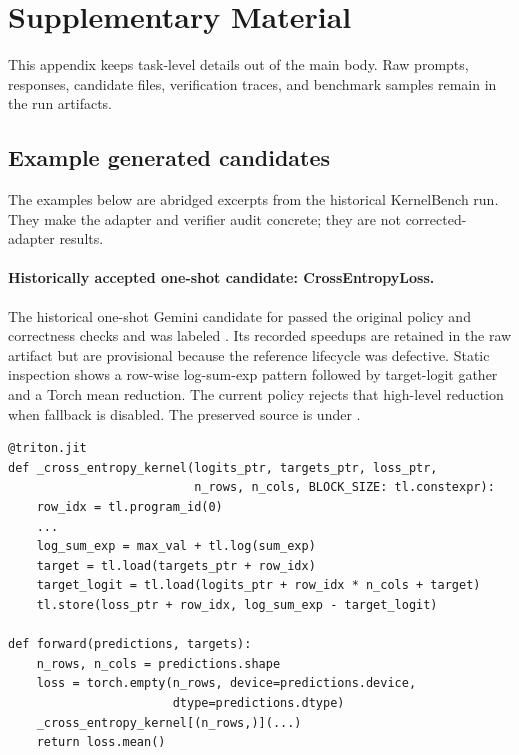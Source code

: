 \section{Supplementary Material}

This appendix keeps task-level details out of the main body. Raw prompts, responses, candidate files, verification traces, and benchmark samples remain in the run artifacts.

\subsection{Example generated candidates}

The examples below are abridged excerpts from the historical KernelBench run. They make the adapter and verifier audit concrete; they are not corrected-adapter results.

\paragraph{Historically accepted one-shot candidate: CrossEntropyLoss.}
The historical one-shot Gemini candidate for  passed the original policy and correctness checks and was labeled . Its recorded speedups are retained in the raw artifact but are provisional because the reference lifecycle was defective. Static inspection shows a row-wise log-sum-exp pattern followed by target-logit gather and a Torch mean reduction. The current  policy rejects that high-level reduction when fallback is disabled. The preserved source is under .

{\scriptsize
\begin{verbatim}
@triton.jit
def _cross_entropy_kernel(logits_ptr, targets_ptr, loss_ptr,
                          n_rows, n_cols, BLOCK_SIZE: tl.constexpr):
    row_idx = tl.program_id(0)
    ...
    log_sum_exp = max_val + tl.log(sum_exp)
    target = tl.load(targets_ptr + row_idx)
    target_logit = tl.load(logits_ptr + row_idx * n_cols + target)
    tl.store(loss_ptr + row_idx, log_sum_exp - target_logit)

def forward(predictions, targets):
    n_rows, n_cols = predictions.shape
    loss = torch.empty(n_rows, device=predictions.device,
                       dtype=predictions.dtype)
    _cross_entropy_kernel[(n_rows,)](...)
    return loss.mean()
\end{verbatim}
}

